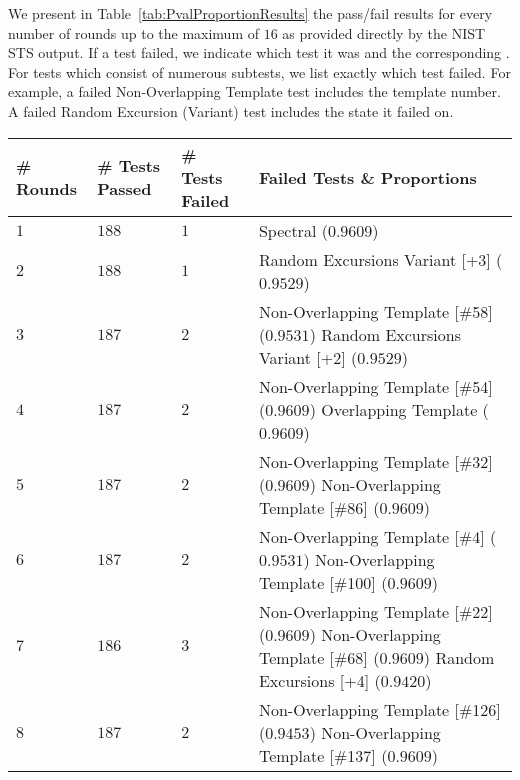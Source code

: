 We present in Table~\ref{tab:PvalProportionResults} the pass/fail results for every number of rounds up to the maximum of $16$ as provided directly by the NIST STS output.
If a test failed, we indicate which test it was and the corresponding \pval.
For tests which consist of numerous subtests, we list exactly which test failed.
For example, a failed Non-Overlapping Template test includes the template number.
A failed Random Excursion (Variant) test includes the state it failed on.

\begin{table}[p]
\centering
\begin{tabular}{>{\centering\arraybackslash}m{1.6cm} |>{\centering\arraybackslash} m{2.5cm} |>{\centering\arraybackslash} m{3cm} | m{7cm}}
\textbf{\# Rounds} & \textbf{\# Tests Passed} & \textbf{\# Tests Failed} & \textbf{Failed Tests \& Proportions} \\
\hline
$1$ & $188$ & $1$ & 
Spectral ($0.9609$) \\

\hline
$2$ & $188$ & $1$ & 
Random Excursions Variant [+3] ($0.9529$) \\

\hline
$3$ & $187$ & $2$ & 
Non-Overlapping Template [\#58] ($0.9531$) \newline
Random Excursions Variant [+2] ($0.9529$) \\

\hline
$4$ & $187$ & $2$ & 
Non-Overlapping Template [\#54] ($0.9609$) \newline
Overlapping Template ($0.9609$) \\

\hline
$5$ & $187$ & $2$ & 
Non-Overlapping Template [\#32] ($0.9609$) \newline
Non-Overlapping Template [\#86] ($0.9609$) \\

\hline
$6$ & $187$ & $2$ & 
Non-Overlapping Template [\#4] ($0.9531$) \newline
Non-Overlapping Template [\#100] ($0.9609$) \\

\hline
$7$ & $186$ & $3$ & 
Non-Overlapping Template [\#22] ($0.9609$) \newline
Non-Overlapping Template [\#68] ($0.9609$) \newline
Random Excursions [+4] ($0.9420$) \\

\hline
$8$ & $187$ & $2$ & 
Non-Overlapping Template [\#126] ($0.9453$) \newline
Non-Overlapping Template [\#137] ($0.9609$) \\


\end{tabular}
\end{table}
